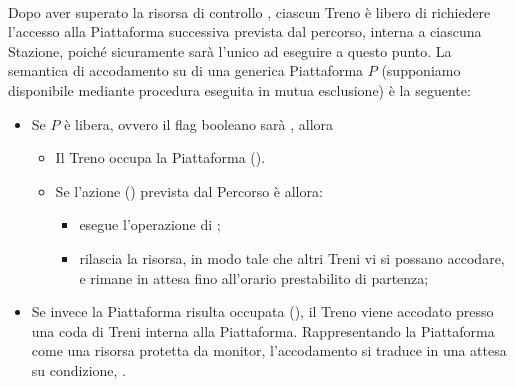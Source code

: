 \begin{description}
		\item{}\\
		
		Dopo aver superato la risorsa di controllo , ciascun Treno è libero di richiedere l'accesso alla Piattaforma successiva prevista dal percorso, interna a ciascuna Stazione, poiché sicuramente sarà l'unico ad eseguire a questo punto. La semantica di accodamento su di una generica Piattaforma $P$ (supponiamo disponibile mediante procedura eseguita in mutua esclusione) è la seguente:
		\begin{itemize}
			\item Se $P$ è libera, ovvero il flag booleano  sarà , allora 
				\begin{itemize}
					\item Il Treno occupa la Piattaforma ().
					\item Se l'azione () prevista dal Percorso è  allora:
						\begin{itemize}
							\item esegue l'operazione di ;
							\item rilascia la risorsa, in modo tale che altri Treni vi si possano accodare, e rimane in attesa fino all'orario prestabilito di partenza;
						\end{itemize}
				\end{itemize} 
			\item Se invece la Piattaforma risulta occupata (), il Treno viene accodato presso una coda di Treni interna alla Piattaforma. Rappresentando la Piattaforma come una risorsa protetta da monitor, l'accodamento si traduce in una attesa su condizione, .
		\end{itemize}
			

\end{description}
